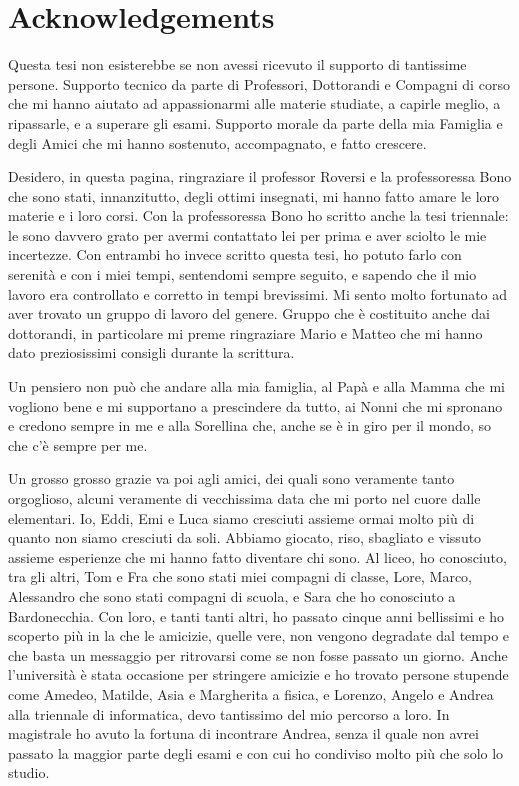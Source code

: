 \chapter{Acknowledgements}
\thispagestyle{empty}
Questa tesi non esisterebbe se non avessi ricevuto il supporto di tantissime persone. Supporto tecnico da parte di Professori, Dottorandi e Compagni di corso che mi hanno aiutato ad appassionarmi alle materie studiate, a capirle meglio, a ripassarle, e a superare gli esami. Supporto morale da parte della mia Famiglia e degli Amici che mi hanno sostenuto, accompagnato, e fatto crescere.

Desidero, in questa pagina, ringraziare il professor Roversi e la professoressa Bono che sono stati, innanzitutto, degli ottimi insegnati, mi hanno fatto amare le loro materie e i loro corsi. Con la professoressa Bono ho scritto anche la tesi triennale: le sono davvero grato per avermi contattato lei per prima e aver sciolto le mie incertezze. Con entrambi ho invece scritto questa tesi, ho potuto farlo con serenità e con i miei tempi, sentendomi sempre seguito, e sapendo che il mio lavoro era controllato e corretto in tempi brevissimi. Mi sento molto fortunato ad aver trovato un gruppo di lavoro del genere. Gruppo che è costituito anche dai dottorandi, in particolare mi preme ringraziare Mario e Matteo che mi hanno dato preziosissimi consigli durante la scrittura.

Un pensiero non può che andare alla mia famiglia, al Papà e alla Mamma che mi vogliono bene e mi supportano a prescindere da tutto, ai Nonni che mi spronano e credono sempre in me e alla Sorellina che, anche se è in giro per il mondo, so che c'è sempre per me.

Un grosso grosso grazie va poi agli amici, dei quali sono veramente tanto orgoglioso, alcuni veramente di vecchissima data che mi porto nel cuore dalle elementari. Io, Eddi, Emi e Luca siamo cresciuti assieme ormai molto più di quanto non siamo cresciuti da soli. Abbiamo giocato, riso, sbagliato e vissuto assieme esperienze che mi hanno fatto diventare chi sono.  Al liceo, ho conosciuto, tra gli altri, Tom e Fra che sono stati miei compagni di classe, Lore, Marco, Alessandro che sono stati compagni di scuola, e Sara che ho conosciuto a Bardonecchia. Con loro, e tanti tanti altri, ho passato cinque anni bellissimi e ho scoperto più in la che le amicizie, quelle vere, non vengono degradate dal tempo e che basta un messaggio per ritrovarsi come se non fosse passato un giorno. Anche l'università è stata occasione per stringere amicizie e ho trovato persone stupende come Amedeo, Matilde, Asia e Margherita a fisica, e Lorenzo, Angelo e Andrea alla triennale di informatica, devo tantissimo del mio percorso a loro. In magistrale ho avuto la fortuna di incontrare Andrea, senza il quale non avrei passato la maggior parte degli esami e con cui ho condiviso molto più che solo lo studio.


